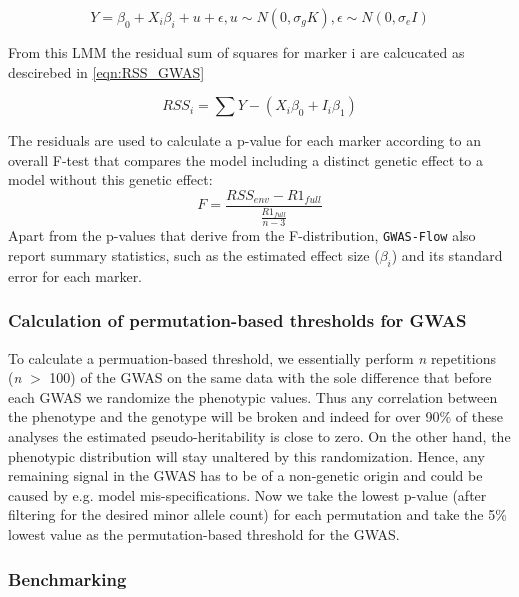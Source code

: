\begin{equation}
Y = \beta_{0} + X_i\beta_i + u + \epsilon, u \sim N(0,\sigma_gK), \epsilon \sim N(0,\sigma_e I )
\label{eqn:LMM GWAS}
\end{equation}

From this LMM the residual sum of squares for marker i are calcucated as descirebed in \ref{eqn:RSS_GWAS}


\begin{equation}
RSS_{i} = \sum{Y - (X_{i}\beta_{0}  + I_{i}\beta_{1})}
\label{eqn:RSS_GWAS}
\end{equation}




\noindent
The residuals are used to calculate a p-value for each marker according to an overall F-test that compares the
model including a distinct genetic effect to a model without this genetic effect:
\begin{equation}
 F = \frac{RSS_{env} - R1_{full} }{\frac{R1_{full}}{n-3}}
 \label{F_test}
 \end{equation}
\noindent
Apart from the p-values that derive from the F-distribution, \texttt{GWAS-Flow} also report summary statistics, such as the estimated
effect size ($\beta_i$) and its standard error for each marker.
\subsubsection{Calculation of permutation-based thresholds for GWAS}

To calculate a permuation-based threshold, we essentially perform \textit{n} repetitions (\textit{n} $>$ 100)
of the GWAS on the same data with the sole difference that before each GWAS we randomize the phenotypic
values. Thus any correlation between the phenotype and the genotype will be broken and indeed for over 90\% of
these analyses the estimated pseudo-heritability is close to zero. On the other hand, the phenotypic
distribution will stay unaltered by this randomization. Hence, any remaining signal in the GWAS has to be of a
non-genetic origin and could be caused by e.g. model mis-specifications. Now we take the lowest p-value (after
filtering for the desired minor allele count) for each permutation and take the 5\% lowest value as the
permutation-based threshold for the GWAS.

\subsubsection{Benchmarking}

